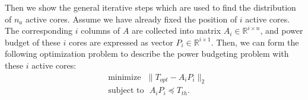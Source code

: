 Then we show the general iterative steps which are used to find the distribution of $n_{a}$ active cores. Assume we have already fixed the position of $i$ active cores. The corresponding $i$ columns of $A$ are collected into
matrix $A_i \in \mathbb{R}^{i \times n}$, and power budget of these $i$
cores are expressed as vector $P_i \in \mathbb{R}^{i \times 1}$. Then,
we can form the following optimization problem to describe the power
budgeting problem with these $i$ active cores:
\begin{equation}\label{eq:temp_ss_i_pb}
  \begin{split}
    &\text{minimize~~} \|T_{opt}-A_i P_i\|_2\\
    &\text{subject to~~} A_i P_i\preceq T_{th}.
  \end{split}
\end{equation}

